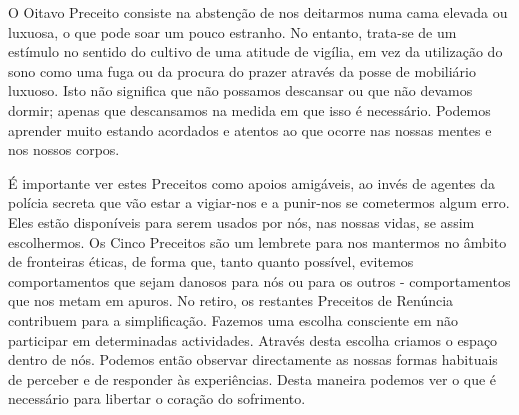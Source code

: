 O Oitavo Preceito consiste na abstenção de nos deitarmos numa cama
elevada ou luxuosa, o que pode soar um pouco estranho. No entanto,
trata-se de um estímulo no sentido do cultivo de uma atitude de vigília,
em vez da utilização do sono como uma fuga ou da procura do prazer
através da posse de mobiliário luxuoso. Isto não significa que não
possamos descansar ou que não devamos dormir; apenas que descansamos na
medida em que isso é necessário. Podemos aprender muito estando
acordados e atentos ao que ocorre nas nossas mentes e nos nossos corpos.

É importante ver estes Preceitos como apoios amigáveis, ao invés de
agentes da polícia secreta que vão estar a vigiar-nos e a punir-nos se
cometermos algum erro. Eles estão disponíveis para serem usados por nós,
nas nossas vidas, se assim escolhermos. Os Cinco Preceitos são um
lembrete para nos mantermos no âmbito de fronteiras éticas, de forma
que, tanto quanto possível, evitemos comportamentos que sejam danosos
para nós ou para os outros - comportamentos que nos metam em apuros. No
retiro, os restantes Preceitos de Renúncia contribuem para a
simplificação. Fazemos uma escolha consciente em não participar em
determinadas actividades. Através desta escolha criamos o espaço dentro
de nós. Podemos então observar directamente as nossas formas habituais
de perceber e de responder às experiências. Desta maneira podemos ver o
que é necessário para libertar o coração do sofrimento.

